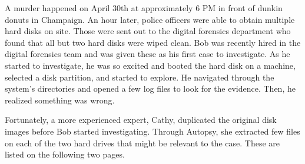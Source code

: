 \documentclass[addpoints,answers]{exam}
\begin{document}
\begin{questions}
\begin{parts}
\end{parts}

\pagebreak


A murder happened on April 30th at approximately 6 PM in front of dunkin
donuts in Champaign. An hour later, police officers were able to obtain 
multiple hard disks on site. Those were sent out to the digital forensics 
department who found that all but two hard disks were wiped clean. Bob was 
recently hired in the digital forensics team and was given these as his 
first case to investigate. As he started to investigate, he was so excited 
and booted the hard disk on a machine, selected a disk partition, and 
started to explore. He navigated through the system's directories and 
opened a few log files to look for the evidence. Then, he realized 
something was wrong.

Fortunately, a more experienced expert, Cathy, duplicated the original
disk images before Bob started investigating. Through Autopsy, she
extracted few files on each of the two hard drives that might be
relevant to the case. These are listed on the following two pages.

\end{questions}
\end{document}
